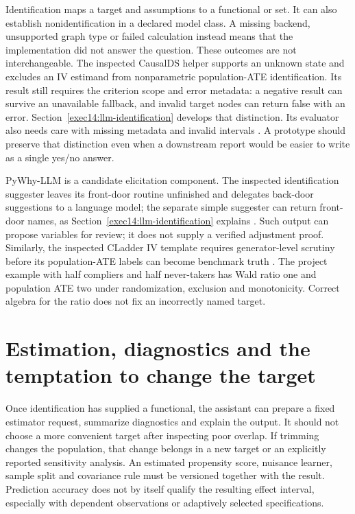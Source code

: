 Identification maps a target and assumptions to a functional or set. It can
also establish nonidentification in a declared model class. A missing backend,
unsupported graph type or failed calculation instead means that the
implementation did not answer the question. These outcomes are not
interchangeable. The inspected CausalDS helper supports an unknown state and excludes an IV
estimand from nonparametric population-ATE identification. Its result still
requires the criterion scope and error metadata: a negative result can survive
an unavailable fallback, and invalid target nodes can return false with an
error. Section~\ref{exec14:llm-identification} develops that distinction. Its
evaluator also needs care with missing metadata and invalid intervals
\citep{v12_la_package_causalds}. A prototype should preserve that distinction even
when a downstream report would be easier to write as a single yes/no answer.

PyWhy-LLM is a candidate elicitation component. The inspected identification
suggester leaves its front-door routine unfinished and delegates back-door
suggestions to a language model; the separate simple suggester can return
front-door names, as Section~\ref{exec14:llm-identification} explains
\citep{v12_la_package_pywhy_llm}. Such output can propose variables for review; it
does not supply a verified adjustment proof. Similarly, the inspected CLadder
IV template requires generator-level scrutiny before its population-ATE labels
can become benchmark truth \citep{v12_la_package_cladder}. The project example
with half compliers and half never-takers has Wald ratio one and population ATE
two under randomization, exclusion and monotonicity. Correct algebra for the
ratio does not fix an incorrectly named target.

\section{Estimation, diagnostics and the temptation to change the target}

Once identification has supplied a functional, the assistant can prepare a fixed
estimator request, summarize diagnostics and explain the output. It should not
choose a more convenient target after inspecting poor overlap. If trimming
changes the population, that change belongs in a new target or an explicitly
reported sensitivity analysis. An estimated propensity score, nuisance learner,
sample split and covariance rule must be versioned together with the result.
Prediction accuracy does not by itself qualify the resulting effect interval,
especially with dependent observations or adaptively selected specifications.


